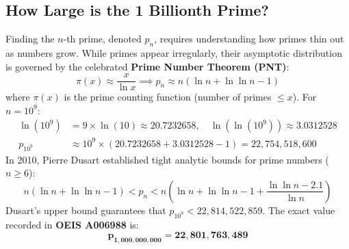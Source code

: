 \documentclass[11pt,a4paper]{article}
\begin{document}
\subsection{How Large is the 1 Billionth Prime?}
Finding the $n$-th prime, denoted $p_n$, requires understanding how primes thin out as numbers grow. While primes appear irregularly, their asymptotic distribution is governed by the celebrated \textbf{Prime Number Theorem (PNT)}:
\begin{equation}
    \pi(x) \approx \frac{x}{\ln x} \implies p_n \approx n \left( \ln n + \ln \ln n - 1 \right)
\end{equation}
where $\pi(x)$ is the prime counting function (number of primes $\le x$). For $n = 10^9$:
\begin{align*}
    \ln(10^9) &= 9 \times \ln(10) \approx 20.7232658, \quad \ln(\ln(10^9)) \approx 3.0312528 \\
    p_{10^9} &\approx 10^9 \times (20.7232658 + 3.0312528 - 1) = 22,754,518,600
\end{align*}
In 2010, Pierre Dusart established tight analytic bounds for prime numbers ($n \ge 6$):
\begin{equation}
    n \left( \ln n + \ln \ln n - 1 \right) < p_n < n \left( \ln n + \ln \ln n - 1 + \frac{\ln \ln n - 2.1}{\ln n} \right)
\end{equation}
Dusart's upper bound guarantees that $p_{10^9} < 22,814,522,859$. The exact value recorded in \textbf{OEIS A006988} is:
\begin{equation}
    \mathbf{p_{1,000,000,000} = 22,801,763,489}
\end{equation}
\end{document}
